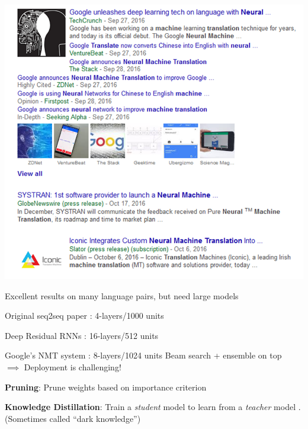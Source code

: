 \documentclass{beamer}
\let\tempone\itemize
\let\temptwo\enditemize
\renewenvironment{itemize}{\tempone\addtolength{\itemsep}{0.5\baselineskip}}{\temptwo}
\newcommand{\air}{\vspace{0.25cm}}
\newcommand{\Cite}[1]{{\footnotesize \citep{#1}}}
\begin{document}
\begin{frame}
\center
\includegraphics[scale=0.5]{nmt-news} \\
\end{frame}

\begin{frame}
\centerline{} \air \air
Excellent results on many language pairs, but need large models \air
\begin{itemize}
\item Original seq2seq paper \Cite{Sutskever2014}: 4-layers/1000 units
\item Deep Residual RNNs \Cite{Zhou2016} : 16-layers/512 units 
\item Google's NMT system \Cite{Wu2016}: 8-layers/1024 units 
\end{itemize}
\air 
\air 
\pause
Beam search + ensemble on top
\\ 
\air
$\implies$ Deployment is challenging! 
\end{frame}


\begin{frame}
  \centerline{}
\air
\begin{itemize}
\item \textbf{Pruning}: Prune weights based on importance criterion 
\Cite{LeCun1990,Han2016,See2016}
\item \textbf{Knowledge Distillation}: Train a \textit{student} model to learn 
from a \textit{teacher} model \Cite{Bucila2006,Ba2014,Hinton2015,Kuncoro2016}. 
(Sometimes called ``dark knowledge'')
\end{itemize}
\end{frame}
\end{document}
